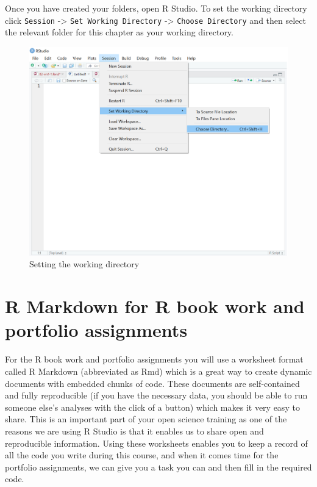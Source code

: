 \documentclass[]{book}
\begin{document}
Once you have created your folders, open R Studio. To set the working directory click \texttt{Session} -\textgreater{} \texttt{Set\ Working\ Directory} -\textgreater{} \texttt{Choose\ Directory} and then select the relevant folder for this chapter as your working directory.

\begin{figure}

{\centering \includegraphics[width=1\linewidth]{images/working-dir} 

}

\caption{Setting the working directory}\label{fig:img-working-dir}
\end{figure}

\hypertarget{r-markdown-for-r-book-work-and-portfolio-assignments}{%
\section{R Markdown for R book work and portfolio assignments}\label{r-markdown-for-r-book-work-and-portfolio-assignments}}

For the R book work and portfolio assignments you will use a worksheet format called R Markdown (abbreviated as Rmd) which is a great way to create dynamic documents with embedded chunks of code. These documents are self-contained and fully reproducible (if you have the necessary data, you should be able to run someone else's analyses with the click of a button) which makes it very easy to share. This is an important part of your open science training as one of the reasons we are using R Studio is that it enables us to share open and reproducible information. Using these worksheets enables you to keep a record of all the code you write during this course, and when it comes time for the portfolio assignments, we can give you a task you can and then fill in the required code.
\end{document}
